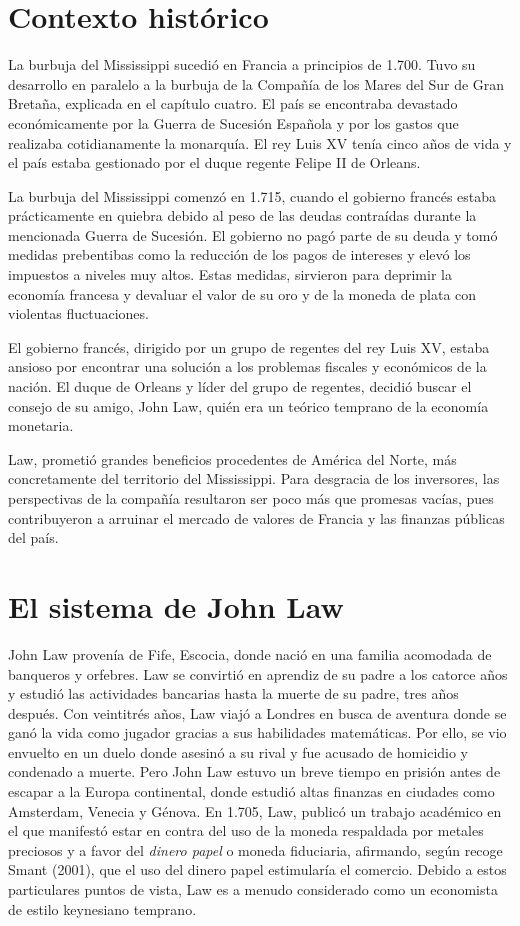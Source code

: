 \section{Contexto histórico}
La burbuja del Mississippi sucedió en Francia a principios de 1.700. Tuvo su desarrollo en paralelo a la burbuja de la Compañía de los Mares del Sur de Gran Bretaña, explicada en el capítulo cuatro.
El país se encontraba devastado económicamente por la Guerra de Sucesión Española y por los gastos que realizaba cotidianamente la monarquía. El rey Luis XV tenía cinco años de vida y el país estaba gestionado por el duque regente Felipe II de Orleans. 

La burbuja del Mississippi comenzó en 1.715, cuando el gobierno francés estaba prácticamente en quiebra debido al peso de las deudas contraídas durante la mencionada Guerra de Sucesión. El gobierno no pagó parte de su deuda y tomó medidas prebentibas como la reducción de los pagos de intereses y elevó los impuestos a niveles muy altos. Estas medidas, sirvieron para deprimir la economía francesa y devaluar el valor de su oro y de la moneda de plata con violentas fluctuaciones. 

El gobierno francés, dirigido por un grupo de regentes del rey Luis XV, estaba ansioso por encontrar una solución a los problemas fiscales y económicos de la nación. El duque de Orleans y líder del grupo de regentes, decidió buscar el consejo de su amigo, John Law, quién era un teórico temprano de la economía monetaria.

Law, prometió grandes beneficios procedentes de América del Norte, más concretamente del territorio del Mississippi. Para desgracia de los inversores, las perspectivas de la compañía resultaron ser poco más que promesas vacías, pues contribuyeron a arruinar el mercado de valores de Francia y las finanzas públicas del país.

\section{El sistema de John Law}

John Law provenía de Fife, Escocia, donde nació en una familia acomodada de banqueros y orfebres. Law se convirtió en aprendiz de su padre a los catorce años y estudió las actividades bancarias hasta la muerte de su padre, tres años después. Con veintitrés años, Law viajó a Londres en busca de aventura donde se ganó la vida como jugador gracias a sus habilidades matemáticas. Por ello, se vio envuelto en un duelo donde asesinó a su rival y fue acusado de homicidio y condenado a muerte. Pero John Law estuvo un breve tiempo en prisión antes de escapar a la Europa continental, donde estudió altas finanzas en ciudades como Amsterdam, Venecia y Génova. En 1.705, Law, publicó un trabajo académico en el que manifestó estar en contra del uso de la moneda respaldada por metales preciosos y a favor del \emph{dinero papel} o moneda fiduciaria, afirmando, según recoge Smant (2001), que el uso del dinero papel estimularía el comercio. Debido a estos particulares puntos de vista, Law es a menudo considerado como un economista de estilo keynesiano temprano. 

